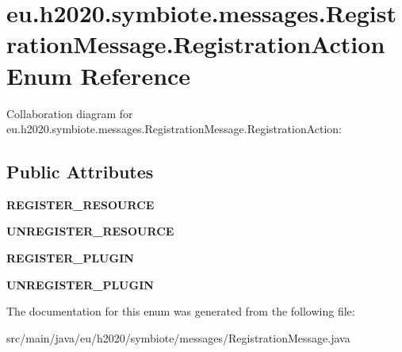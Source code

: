 \hypertarget{enumeu_1_1h2020_1_1symbiote_1_1messages_1_1RegistrationMessage_1_1RegistrationAction}{}\section{eu.\+h2020.\+symbiote.\+messages.\+Registration\+Message.\+Registration\+Action Enum Reference}
\label{enumeu_1_1h2020_1_1symbiote_1_1messages_1_1RegistrationMessage_1_1RegistrationAction}


Collaboration diagram for eu.\+h2020.\+symbiote.\+messages.\+Registration\+Message.\+Registration\+Action\+:
\subsection*{Public Attributes}
\begin{DoxyCompactItemize}
\item 
\mbox{\label{enumeu_1_1h2020_1_1symbiote_1_1messages_1_1RegistrationMessage_1_1RegistrationAction_a0bd05524fc8c02da8ffceac4a221abe3}} 
{\bfseries R\+E\+G\+I\+S\+T\+E\+R\+\_\+\+R\+E\+S\+O\+U\+R\+CE}
\item 
\mbox{\label{enumeu_1_1h2020_1_1symbiote_1_1messages_1_1RegistrationMessage_1_1RegistrationAction_a0e8f9ff55506c961ec01285ec1ca3ff1}} 
{\bfseries U\+N\+R\+E\+G\+I\+S\+T\+E\+R\+\_\+\+R\+E\+S\+O\+U\+R\+CE}
\item 
\mbox{\label{enumeu_1_1h2020_1_1symbiote_1_1messages_1_1RegistrationMessage_1_1RegistrationAction_ab304c4597a4862151f5e6c076e923885}} 
{\bfseries R\+E\+G\+I\+S\+T\+E\+R\+\_\+\+P\+L\+U\+G\+IN}
\item 
\mbox{\label{enumeu_1_1h2020_1_1symbiote_1_1messages_1_1RegistrationMessage_1_1RegistrationAction_aa8f315543e49f43eb096cfe6086b4a06}} 
{\bfseries U\+N\+R\+E\+G\+I\+S\+T\+E\+R\+\_\+\+P\+L\+U\+G\+IN}
\end{DoxyCompactItemize}


The documentation for this enum was generated from the following file\+:\begin{DoxyCompactItemize}
\item 
src/main/java/eu/h2020/symbiote/messages/Registration\+Message.\+java\end{DoxyCompactItemize}
